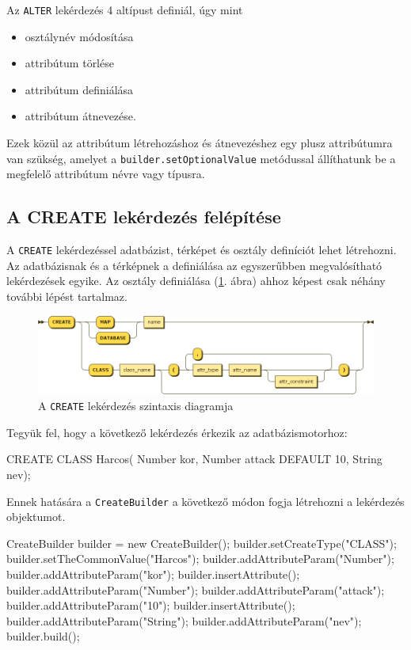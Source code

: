 Az \texttt{ALTER} lekérdezés 4 altípust definiál, úgy mint

\begin{itemize}
\item osztálynév módosítása
\item attribútum törlése
\item attribútum definiálása
\item attribútum átnevezése.
\end{itemize}

Ezek közül az attribútum létrehozáshoz és átnevezéshez egy plusz attribútumra van szükség, amelyet a \texttt{builder.setOptionalValue} metódussal állíthatunk be a megfelelő attribútum névre vagy típusra.

\subsection{A CREATE lekérdezés felépítése}

A \texttt{CREATE} lekérdezéssel adatbázist, térképet és osztály definíciót lehet létrehozni. Az adatbázisnak és a térképnek a definiálása az egyszerűbben megvalósítható lekérdezések egyike. Az osztály definiálása (\ref{fig:createClassSytnax}. ábra) ahhoz képest csak néhány további lépést tartalmaz.


\begin{figure}[htb]
	\begin{center}
		\includegraphics[scale=0.48]{images/create_expr}
		\caption{A \texttt{CREATE} lekérdezés szintaxis diagramja}
		\label{fig:createClassSytnax}
	\end{center}
\end{figure}

Tegyük fel, hogy a következő lekérdezés érkezik az adatbázismotorhoz:
\begin{sql}
CREATE CLASS Harcos(
Number kor,
Number attack DEFAULT 10,
String nev);
\end{sql}

Ennek hatására a \texttt{CreateBuilder} a következő módon fogja létrehozni a lekérdezés objektumot.

\begin{java}
CreateBuilder builder = new CreateBuilder();
builder.setCreateType("CLASS");
builder.setTheCommonValue("Harcos");
builder.addAttributeParam("Number");
builder.addAttributeParam("kor");
builder.insertAttribute();
builder.addAttributeParam("Number");
builder.addAttributeParam("attack");
builder.addAttributeParam("10");
builder.insertAttribute();
builder.addAttributeParam("String");
builder.addAttributeParam("nev");
builder.build();
\end{java}

